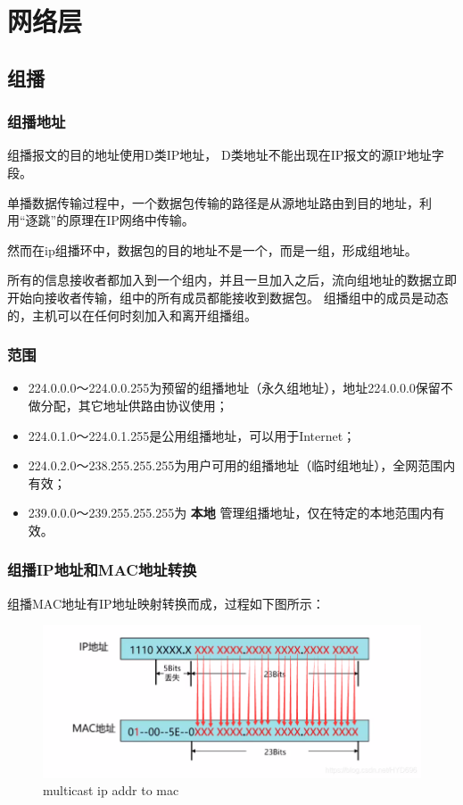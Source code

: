 \section{网络层}
\subsection{组播}
\subsubsection{组播地址}

组播报文的目的地址使用D类IP地址， D类地址不能出现在IP报文的源IP地址字段。

单播数据传输过程中，一个数据包传输的路径是从源地址路由到目的地址，利用“逐跳”的原理在IP网络中传输。

然而在ip组播环中，数据包的目的地址不是一个，而是一组，形成组地址。

所有的信息接收者都加入到一个组内，并且一旦加入之后，流向组地址的数据立即开始向接收者传输，组中的所有成员都能接收到数据包。
组播组中的成员是动态的，主机可以在任何时刻加入和离开组播组。

\subsubsection{范围}

\begin{itemize}
    \item 224.0.0.0～224.0.0.255为预留的组播地址（永久组地址），地址224.0.0.0保留不做分配，其它地址供路由协议使用；
    \item 224.0.1.0～224.0.1.255是公用组播地址，可以用于Internet；
    \item 224.0.2.0～238.255.255.255为用户可用的组播地址（临时组地址），全网范围内有效；
    \item 239.0.0.0～239.255.255.255为 \textbf{本地} 管理组播地址，仅在特定的本地范围内有效。

\end{itemize}

\subsubsection{组播IP地址和MAC地址转换}

组播MAC地址有IP地址映射转换而成，过程如下图所示：

\begin{figure}[ht]
    \centering
    \includegraphics[scale=0.7]{pic/multicast-01.png}
    \caption{multicast ip addr to mac}
    \label{fig:multicast_ip_addr_to_mac}
\end{figure}


